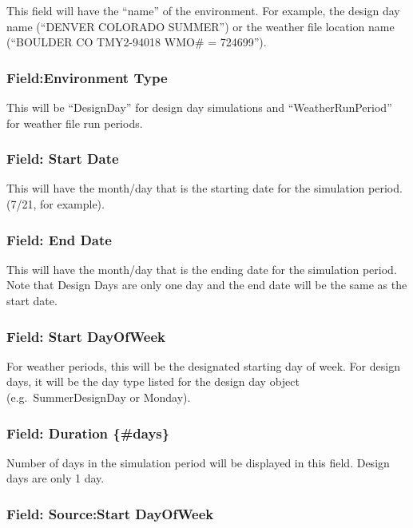 This field will have the ``name'' of the environment. For example, the design day name (``DENVER COLORADO SUMMER'') or the weather file location name (``BOULDER CO TMY2-94018 WMO\# = 724699'').

\subsubsection{Field:Environment Type}\label{fieldenvironment-type}

This will be ``DesignDay'' for design day simulations and ``WeatherRunPeriod'' for weather file run periods.

\subsubsection{Field: Start Date}\label{field-start-date}

This will have the month/day that is the starting date for the simulation period. (7/21, for example).

\subsubsection{Field: End Date}\label{field-end-date}

This will have the month/day that is the ending date for the simulation period. Note that Design Days are only one day and the end date will be the same as the start date.

\subsubsection{Field: Start DayOfWeek}\label{field-start-dayofweek}

For weather periods, this will be the designated starting day of week. For design days, it will be the day type listed for the design day object (e.g.~SummerDesignDay or Monday).

\subsubsection{Field: Duration \{\#days\}}\label{field-duration-days}

Number of days in the simulation period will be displayed in this field. Design days are only 1 day.

\subsubsection{Field: Source:Start DayOfWeek}\label{field-sourcestart-dayofweek}

